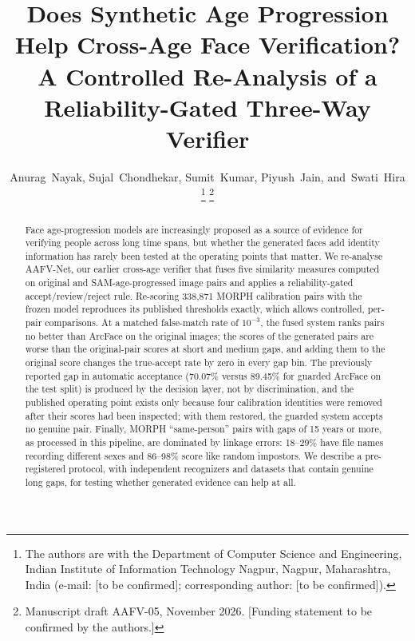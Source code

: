 \documentclass[journal]{IEEEtran}
\begin{document}
\title{Does Synthetic Age Progression Help Cross-Age Face Verification?\\ A Controlled Re-Analysis of a Reliability-Gated Three-Way Verifier}

\author{Anurag~Nayak,
        Sujal~Chondhekar,
        Sumit~Kumar,
        Piyush~Jain,
        and~Swati~Hira%
\thanks{The authors are with the Department of Computer Science and Engineering, Indian Institute of Information Technology Nagpur, Nagpur, Maharashtra, India (e-mail: [to be confirmed]; corresponding author: [to be confirmed]).}%
\thanks{Manuscript draft AAFV-05, November 2026. [Funding statement to be confirmed by the authors.]}}


\maketitle

\begin{abstract}
Face age-progression models are increasingly proposed as a source of evidence for verifying people across long time spans, but whether the generated faces add identity information has rarely been tested at the operating points that matter. We re-analyse AAFV-Net, our earlier cross-age verifier that fuses five similarity measures computed on original and SAM-age-progressed image pairs and applies a reliability-gated accept/review/reject rule. Re-scoring 338,871 MORPH calibration pairs with the frozen model reproduces its published thresholds exactly, which allows controlled, per-pair comparisons. At a matched false-match rate of $10^{-3}$, the fused system ranks pairs no better than ArcFace on the original images; the scores of the generated pairs are worse than the original-pair scores at short and medium gaps, and adding them to the original score changes the true-accept rate by zero in every gap bin. The previously reported gap in automatic acceptance (70.07\% versus 89.45\% for guarded ArcFace on the test split) is produced by the decision layer, not by discrimination, and the published operating point exists only because four calibration identities were removed after their scores had been inspected; with them restored, the guarded system accepts no genuine pair. Finally, MORPH ``same-person'' pairs with gaps of 15 years or more, as processed in this pipeline, are dominated by linkage errors: 18--29\% have file names recording different sexes and 86--98\% score like random impostors. We describe a pre-registered protocol, with independent recognizers and datasets that contain genuine long gaps, for testing whether generated evidence can help at all.
\end{abstract}
\end{document}
